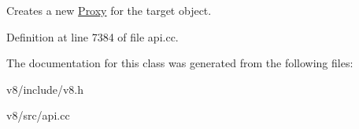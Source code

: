 Creates a new \mbox{\hyperlink{classv8_1_1Proxy}{Proxy}} for the target object. 

Definition at line 7384 of file api.\+cc.



The documentation for this class was generated from the following files\+:\begin{DoxyCompactItemize}
\item 
v8/include/v8.\+h\item 
v8/src/api.\+cc\end{DoxyCompactItemize}
